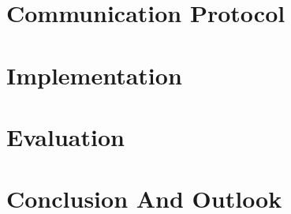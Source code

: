 \documentclass[
	paper=a4,
	fontsize=11pt,
	parskip=full %
]{scrreprt}
\begin{document}
    \chapter{Communication Protocol}\label{ch:protocol}
    

    \chapter{Implementation}\label{ch:implementation}
    

    \chapter{Evaluation}\label{ch:evaluation}
    

    \chapter{Conclusion And Outlook}\label{ch:conclusion}
    

    \printglossaries
	
    \printbibliography[heading=bibintoc]
\end{document}
